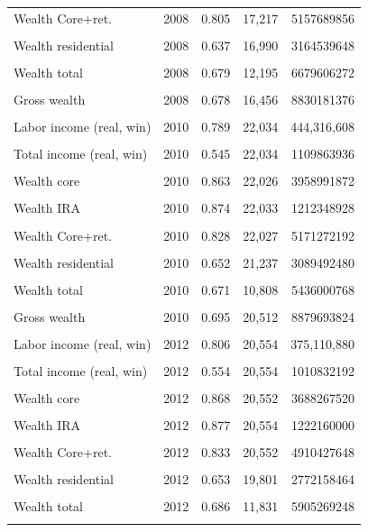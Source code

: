\begin{table}[htbp]
\begin{tabular}{llrrr}
Wealth Core+ret. & 2008 & 0.805 & 17,217 & 5157689856 \\\\
Wealth residential & 2008 & 0.637 & 16,990 & 3164539648 \\\\
Wealth total & 2008 & 0.679 & 12,195 & 6679606272 \\\\
Gross wealth & 2008 & 0.678 & 16,456 & 8830181376 \\\\
Labor income (real, win) & 2010 & 0.789 & 22,034 & 444,316,608 \\\\
Total income (real, win) & 2010 & 0.545 & 22,034 & 1109863936 \\\\
Wealth core & 2010 & 0.863 & 22,026 & 3958991872 \\\\
Wealth IRA & 2010 & 0.874 & 22,033 & 1212348928 \\\\
Wealth Core+ret. & 2010 & 0.828 & 22,027 & 5171272192 \\\\
Wealth residential & 2010 & 0.652 & 21,237 & 3089492480 \\\\
Wealth total & 2010 & 0.671 & 10,808 & 5436000768 \\\\
Gross wealth & 2010 & 0.695 & 20,512 & 8879693824 \\\\
Labor income (real, win) & 2012 & 0.806 & 20,554 & 375,110,880 \\\\
Total income (real, win) & 2012 & 0.554 & 20,554 & 1010832192 \\\\
Wealth core & 2012 & 0.868 & 20,552 & 3688267520 \\\\
Wealth IRA & 2012 & 0.877 & 20,554 & 1222160000 \\\\
Wealth Core+ret. & 2012 & 0.833 & 20,552 & 4910427648 \\\\
Wealth residential & 2012 & 0.653 & 19,801 & 2772158464 \\\\
Wealth total & 2012 & 0.686 & 11,831 & 5905269248 \\\\

\end{tabular}
\end{table}
